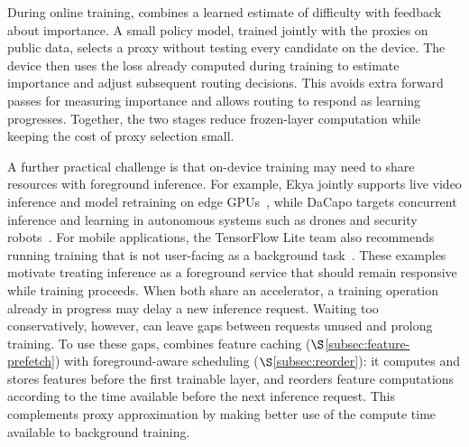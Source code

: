 During online training, \sys combines a learned estimate of difficulty with feedback about importance.
A small policy model, trained jointly with the proxies on public data, selects a proxy without testing every candidate on the device.
The device then uses the loss already computed during training to estimate importance and adjust subsequent routing decisions.
This avoids extra forward passes for measuring importance and allows routing to respond as learning progresses.
Together, the two stages reduce frozen-layer computation while keeping the cost of proxy selection small.
\par
\endgroup

\begingroup
\color{blue}
A further practical challenge is that on-device training may need to share resources with foreground inference.
For example, Ekya jointly supports live video inference and model retraining on edge GPUs~\cite{bhardwaj2022ekya}, while DaCapo targets concurrent inference and learning in autonomous systems such as drones and security robots~\cite{kim2024dacapo}.
For mobile applications, the TensorFlow Lite team also recommends running training that is not user-facing as a background task~\cite{tflite2021ondevicetraining}.
These examples motivate treating inference as a foreground service that should remain responsive while training proceeds.
When both share an accelerator, a training operation already in progress may delay a new inference request.
Waiting too conservatively, however, can leave gaps between requests unused and prolong training.
To use these gaps, \sys combines feature caching ($\S$\ref{subsec:feature-prefetch}) with foreground-aware scheduling ($\S$\ref{subsec:reorder}): it computes and stores features before the first trainable layer, and reorders feature computations according to the time available before the next inference request.
This complements proxy approximation by making better use of the compute time available to background training.
\par
\endgroup

